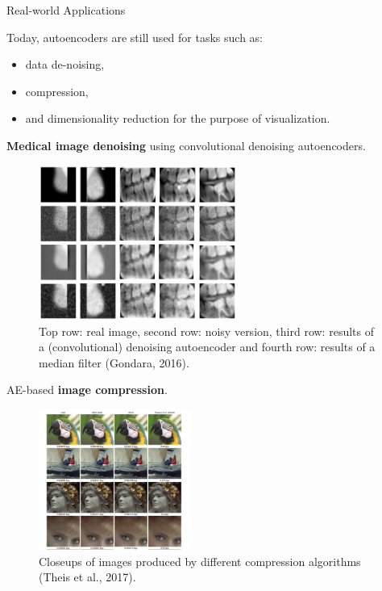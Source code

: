 \begin{vbframe}{Real-world Applications}

Today, autoencoders are still used for tasks such as: 
\begin{itemize}
\item  data de-noising,
\item  compression,
\item and dimensionality reduction for the purpose of visualization.
\end{itemize}

\framebreak 
  \textbf{Medical image denoising} using convolutional denoising autoencoders.
  \begin{figure}
    \centering
    \includegraphics[width=6.5cm]{plots/denoising_autoencoder_application.png}
    \caption{Top row: real image, second row: noisy version, third row: results of a (convolutional) denoising autoencoder and fourth row: results of a median filter (Gondara, 2016).}
  \end{figure}
  
  \framebreak
  AE-based \textbf{image compression}.
  \begin{figure}
    \centering
    \includegraphics[width=5.0cm]{plots/image-compression.png}
    \caption{Closeups of images produced by different compression algorithms (Theis et al., 2017).}
    \end{figure}
  
  
\end{vbframe}

